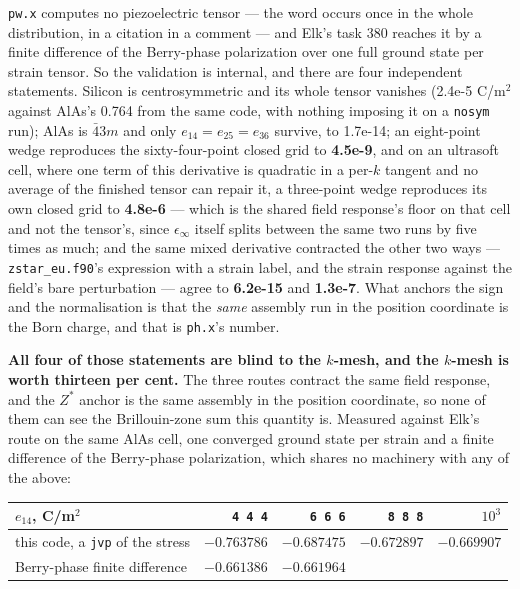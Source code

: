 \documentclass[11pt,a4paper]{article}
\newcommand{\code}[1]{\texttt{\small #1}}
\begin{document}
\code{pw.x} computes no piezoelectric tensor --- the word occurs once in the
whole distribution, in a citation in a comment --- and Elk's task 380 reaches
it by a finite difference of the Berry-phase polarization over one full ground
state per strain tensor. So the validation is internal, and there are four
independent statements. Silicon is centrosymmetric and its whole tensor
vanishes (2.4e-5 C/m$^2$ against AlAs's 0.764 from the same code, with nothing
imposing it on a \code{nosym} run); AlAs is $\bar43m$ and only
$e_{14} = e_{25} = e_{36}$ survive, to 1.7e-14; an eight-point wedge reproduces
the sixty-four-point closed grid to \textbf{4.5e-9}, and on an ultrasoft cell,
where one term of this derivative is quadratic in a per-$k$ tangent and no
average of the finished tensor can repair it, a three-point wedge reproduces its
own closed grid to \textbf{4.8e-6} --- which is the shared field response's
floor on that cell and not the tensor's, since $\epsilon_\infty$ itself splits
between the same two runs by five times as much; and the same mixed
derivative contracted the other two ways --- \code{zstar\_eu.f90}'s expression
with a strain label, and the strain response against the field's bare
perturbation --- agree to \textbf{6.2e-15} and \textbf{1.3e-7}. What anchors
the sign and the normalisation is that the \emph{same} assembly run in the
position coordinate is the Born charge, and that is \code{ph.x}'s number.

\textbf{All four of those statements are blind to the $k$-mesh, and the
$k$-mesh is worth thirteen per cent.} The three routes contract the same field
response, and the $Z^\ast$ anchor is the same assembly in the position
coordinate, so none of them can see the Brillouin-zone sum this quantity is.
Measured against Elk's route on the same AlAs cell, one converged ground state
per strain and a finite difference of the Berry-phase polarization, which
shares no machinery with any of the above:

\begin{center}
\begin{tabular}{@{}lrrrr@{}}
\toprule
$e_{14}$, C/m$^2$ & \code{4 4 4} & \code{6 6 6} & \code{8 8 8} & $10^3$ \\
\midrule
this code, a \code{jvp} of the stress & $-0.763786$ & $-0.687475$ & $-0.672897$ & $-0.669907$ \\
Berry-phase finite difference        & $-0.661386$ & $-0.661964$ &             & \\
\bottomrule
\end{tabular}
\end{center}
\end{document}
